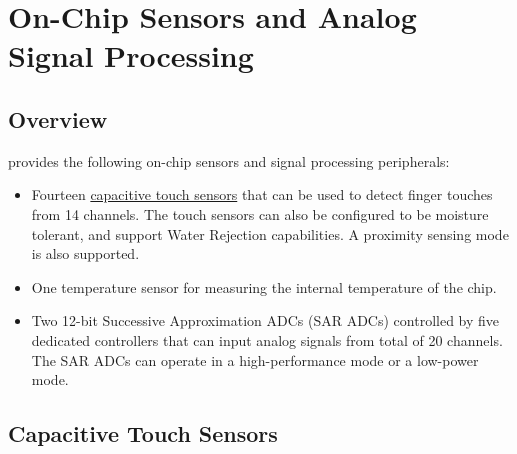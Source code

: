 \documentclass[main\_\_EN.tex]{subfiles}
\begin{document}

\ifglobal
\else
    {\let\clearpage\relax \listoftodos}
    \tableofcontents
\fi



\hypertarget{sensor}{}
\chapter{On-Chip Sensors and Analog Signal Processing}
\label{mod:sensor}

\section{Overview} \label{subsection:on-chip-sensor-overview}

\chipname{} provides the following on-chip sensors and signal processing peripherals:

\begin{itemize}
\item Fourteen \hyperref[ssec:touch sensor]{capacitive touch sensors} that can be used to detect finger touches from 14 channels. The touch sensors can also be configured to be moisture tolerant, and support Water Rejection capabilities. A proximity sensing mode is also supported.

\item One temperature sensor for measuring the internal temperature of the \chipname{} chip.
\item Two 12-bit Successive Approximation ADCs (SAR ADCs) controlled by five dedicated controllers that can input analog signals from total of 20 channels. The SAR ADCs can operate in a high-performance mode or a low-power mode.
\end{itemize}

\section{Capacitive Touch Sensors}\label{ssec:touch sensor}
\end{document}

